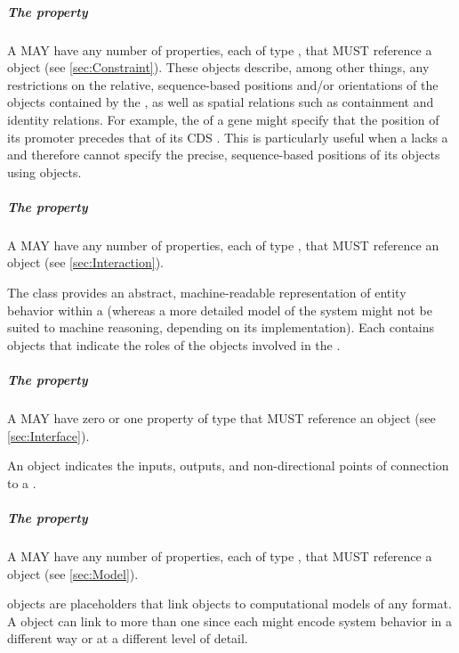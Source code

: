 \subparagraph{The  property}
\label{sec:hasConstraint}

A  MAY have any number of  properties, each of type , that MUST reference a  object (see \ref{sec:Constraint}).  
These objects describe, among other things, any restrictions on the relative, sequence-based positions and/or orientations of the  objects contained by the , as well as spatial relations such as containment and identity relations.
For example, the  of a gene might specify that the position of its promoter  precedes that of its CDS . This is particularly useful when a  lacks a  and therefore cannot specify the precise, sequence-based positions of its  objects using  objects.

\subparagraph{The  property}\label{sec:hasInteraction}

A  MAY have any number of  properties, each of type , that MUST reference an  object (see \ref{sec:Interaction}).  

The  class provides an abstract, machine-readable representation of entity behavior within a  (whereas a more detailed model of the system might not be suited to machine reasoning, depending on its implementation).
Each  contains  objects that indicate the roles of the  objects involved in the .

\subparagraph{The  property}\label{sec:hasInterface}

A  MAY have zero or one  property of type  that MUST reference an  object (see \ref{sec:Interface}).  

An  object indicates the inputs, outputs, and non-directional points of connection to a .

\subparagraph{The  property}\label{sec:hasModel}

A  MAY have any number of  properties, each of type , that MUST reference a  object (see \ref{sec:Model}).  

 objects are placeholders that link  objects to computational models of any format.
A  object can link to more than one  since each might encode system behavior in a different way or at a different level of detail.














